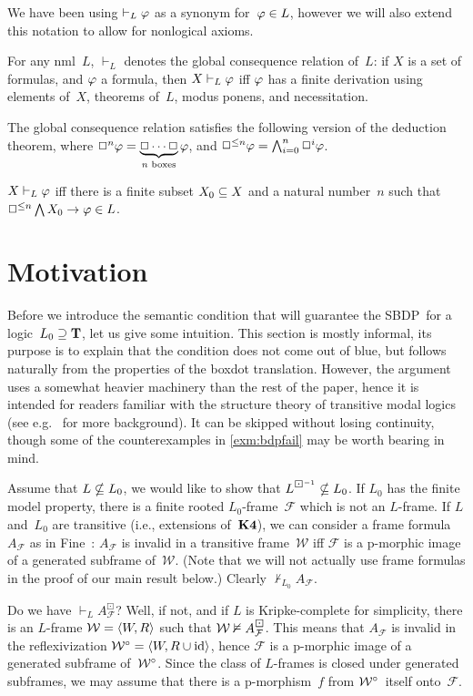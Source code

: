 \documentclass[leqno,draft,11pt]{article}
\def\bdi#1{#1^{\boxdot^{-1}}}
\def\sbc{SBDP}
\let\frm\mathcal
\begin{document}
We have been using $\vdash_L\varphi$ as a synonym for~$\varphi\in L$,
however we will also extend this notation to allow for nonlogical
axioms.
\begin{Def}\th\label{def:vdash}
For any nml~$L$, $\vdash_L$ denotes the global consequence
relation of~$L$: if $X$ is a set of formulas, and $\varphi$ a formula,
then $X\vdash_L\varphi$ iff $\varphi$ has a finite derivation using elements
of~$X$, theorems of~$L$, modus ponens, and necessitation.
\end{Def}
The global consequence relation satisfies the following version of the
deduction theorem, where
$\Box^n\varphi=\underbrace{\Box\cdots\Box}_{n\text{ boxes}}\varphi$, and
$\Box^{\le n}\varphi=\bigwedge_{i=0}^n\Box^i\varphi$.
\begin{Fact}\th\label{fact:dt}
$X\vdash_L\varphi$ iff there is a finite subset $X_0\subseteq X$
and a natural number~$n$ such that $\Box^{\le n}\bigwedge X_0\to\varphi\in L$.
\noproof\end{Fact}

\section{Motivation}\label{sec:motivation}
Before we introduce the semantic condition that will guarantee the
\sbc\ for a logic~$L_0\supseteq\mathbf T$, let us give some intuition.
This section is mostly informal, its purpose is to explain that the
condition does not
come out of blue, but follows naturally from the properties of the
boxdot translation. However, the argument uses a somewhat heavier
machinery than the rest of the paper, hence it is intended for
readers familiar with the structure theory of transitive modal logics
(see e.g.~\cite{cha-zax} for more background).
It can be skipped without losing continuity, though some of the
counterexamples in \th\ref{exm:bdpfail} may be worth bearing in mind.

Assume that $L\nsubseteq L_0$, we would like to show that $\bdi
L\nsset L_0$. If $L_0$ has the finite model property, there is a
finite rooted $L_0$-frame~$\frm F$ which is not an $L$-frame. If $L$
and~$L_0$ are transitive (i.e., extensions of~$\mathbf{K4}$), we can
consider a frame formula~$A_\frm F$ as in Fine~\cite{fine:ff}:
$A_\frm F$ is invalid in a transitive frame~$\frm W$ iff $\frm
F$ is a p-morphic image of a generated subframe of~$\frm W$. (Note
that we will not actually use frame formulas in the proof of our main
result below.) Clearly $\nvdash_{L_0}A_\frm F$.

Do we have $\vdash_LA_\frm F^\boxdot$? Well, if not, and if $L$
is Kripke-complete for simplicity, there is an $L$-frame $\frm
W=\p{W,R}$  such that $\frm W\nmodel A_\frm F^\boxdot$. This
means that $A_\frm F$ is invalid in the reflexivization $\frm
W^\R=\p{W,R\cup\id}$, hence $\frm F$ is a p-morphic image of a
generated subframe of~$\frm W^\R$. Since the class of $L$-frames is
closed under generated subframes, we may assume that there is a
p-morphism~$f$ from $\frm W^\R$~itself onto~$\frm F$.
\end{document}

